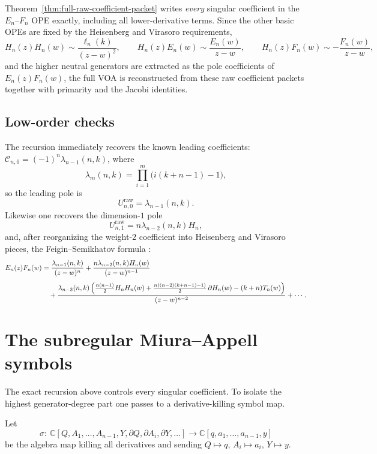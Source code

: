 \begin{remark}
Theorem~\ref{thm:full-raw-coefficient-packet} writes \emph{every} singular
coefficient in the $E_n$--$F_n$ OPE exactly, including all lower-derivative
terms. Since the other basic OPEs are fixed by the Heisenberg and Virasoro
requirements,
\[
H_n(z)H_n(w)\sim \frac{\ell_n(k)}{(z-w)^2},
\qquad
H_n(z)E_n(w)\sim \frac{E_n(w)}{z-w},
\qquad
H_n(z)F_n(w)\sim -\frac{F_n(w)}{z-w},
\]
and the higher neutral generators are extracted as the pole coefficients of
$E_n(z)F_n(w)$, the full VOA is reconstructed from these raw coefficient
packets together with primarity and the Jacobi identities.
\end{remark}

\subsection{Low-order checks}

The recursion immediately recovers the known leading coefficients:
$\mathcal C_{n,0}=(-1)^n\lambda_{n-1}(n,k)$, where
\[
\lambda_m(n,k)=\prod_{i=1}^{m}\bigl(i(k+n-1)-1\bigr),
\]
so the leading pole is
\[
U_{n,0}^{\mathrm{raw}}=\lambda_{n-1}(n,k).
\]
Likewise one recovers the dimension-$1$ pole
\[
U_{n,1}^{\mathrm{raw}}=n\lambda_{n-2}(n,k)H_n,
\]
and, after reorganizing the weight-$2$ coefficient into Heisenberg and Virasoro
pieces, the Feigin--Semikhatov formula
\cite[(A.1)]{FeiginSemikhatov}:
\begin{align}
E_n(z)F_n(w)
&=
\frac{\lambda_{n-1}(n,k)}{(z-w)^n}
+
\frac{n\lambda_{n-2}(n,k)H_n(w)}{(z-w)^{n-1}}
\notag\\[4pt]
&\quad
+\frac{\lambda_{n-3}(n,k)\left(\frac{n(n-1)}2 H_nH_n(w)
+\frac{n((n-2)(k+n-1)-1)}2\,\partial H_n(w)
-(k+n)T_n(w)\right)}{(z-w)^{n-2}}
+\cdots.
\label{eq:fs-pole-two}
\end{align}

\section{The subregular Miura--Appell symbols}

The exact recursion above controls every singular coefficient. To isolate the
highest generator-degree part one passes to a derivative-killing symbol map.

\begin{definition}
\label{def:derivative-killing-symbol}
Let
\[
\sigma:\ \mathbb C[Q,A_1,\dots,A_{n-1},Y,\partial Q,\partial A_i,\partial Y,\dots]
\longrightarrow
\mathbb C[q,a_1,\dots,a_{n-1},y]
\]
be the algebra map killing all derivatives and sending
$Q\mapsto q$, $A_i\mapsto a_i$, $Y\mapsto y$.
\end{definition}

